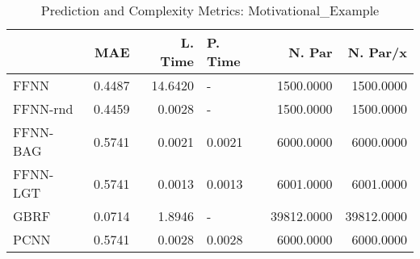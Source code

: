 \begin{table}
\centering
\caption{Prediction and Complexity Metrics: Motivational_Example}
\label{tab__Motivational_Example__Fix_Neurons_QTrue}
\begin{tabular}{lrrlrr}
\toprule
{} &    MAE &  L. Time & P. Time &     N. Par &   N. Par/x \\
\midrule
FFNN     & 0.4487 &  14.6420 &       - &  1500.0000 &  1500.0000 \\
FFNN-rnd & 0.4459 &   0.0028 &       - &  1500.0000 &  1500.0000 \\
FFNN-BAG & 0.5741 &   0.0021 &  0.0021 &  6000.0000 &  6000.0000 \\
FFNN-LGT & 0.5741 &   0.0013 &  0.0013 &  6001.0000 &  6001.0000 \\
GBRF     & 0.0714 &   1.8946 &       - & 39812.0000 & 39812.0000 \\
PCNN     & 0.5741 &   0.0028 &  0.0028 &  6000.0000 &  6000.0000 \\
\bottomrule
\end{tabular}
\end{table}
